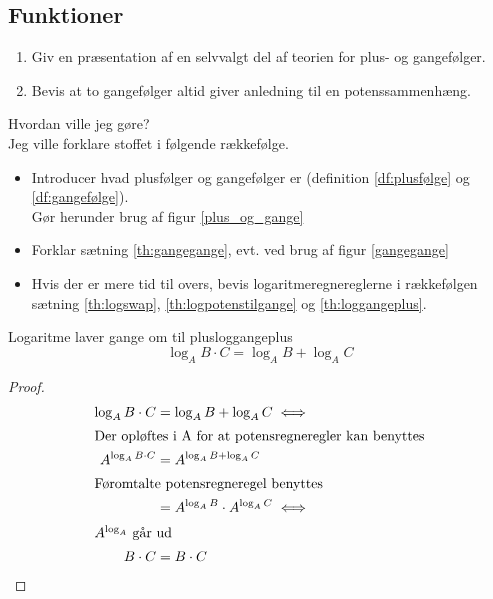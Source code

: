 \documentclass{article}
\begin{document}
\begin{tcolorbox}
	\section{Funktioner}
	\tcblower
	\begin{enumerate}
		\item Giv en præsentation af en selvvalgt del af teorien for plus- og gangefølger.
		\item Bevis at to gangefølger altid giver anledning til en potenssammenhæng.
	\end{enumerate}
\end{tcolorbox}

\begin{eksempel*}{Hvordan ville jeg gøre?}{}\\
	Jeg ville forklare stoffet i følgende rækkefølge.
	\begin{itemize}
		\item Introducer hvad plusfølger og gangefølger er 
			(definition \ref{df:plusfølge} og \ref{df:gangefølge}).\\
			Gør herunder brug af figur \ref{plus_og_gange} %
		\item Forklar sætning \ref{th:gangegange}, evt. ved brug af figur \ref{gangegange}
		\item Hvis der er mere tid til overs, bevis logaritmeregnereglerne i rækkefølgen
			sætning \ref{th:logswap}, \ref{th:logpotenstilgange} og \ref{th:loggangeplus}.
	\end{itemize}
\end{eksempel*}

\begin{theorem}{Logaritme laver gange om til plus}{loggangeplus}
	\[\log_A{B \cdot C} = \log_AB + \log_AC\]
\end{theorem}

\begin{proof}
\begin{align*}
	\log_A{B \cdot C} &= \log_AB + \log_AC \iff\\
\intertext{Der opløftes i A for at potensregneregler kan benyttes}
	A^{\log_A{B \cdot C}} &= A^{\log_AB + \log_AC}\\
\intertext{Føromtalte potensregneregel benyttes}
						  &= A^{\log_AB} \cdot A^{\log_AC} \iff\\
\intertext{$A^{\log_A}$ går ud}
	B \cdot C &= B \cdot C\qedhere
\end{align*}
\end{proof}
\end{document}
